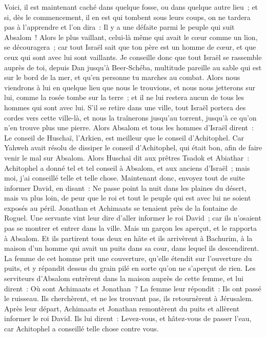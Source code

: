 \begin{multicols}{2}
Voici, il est maintenant caché dans quelque fosse, ou dans quelque autre lieu~; et si, dès le commencement, il en est qui tombent sous leurs coups, on ne tardera pas à l'apprendre et l'on dira~: Il y a une défaite parmi le peuple qui suit Absalom~!
Alors le plus vaillant, celui-là même qui avait le cœur comme un lion, se découragera~; car tout Israël sait que ton père est un homme de cœur, et que ceux qui sont avec lui sont vaillants.
Je conseille donc que tout Israël se rassemble auprès de toi, depuis Dan jusqu'à Beer-Schéba, multitude pareille au sable qui est sur le bord de la mer, et qu'en personne tu marches au combat.
Alors nous viendrons à lui en quelque lieu que nous le trouvions, et nous nous jetterons sur lui, comme la rosée tombe sur la terre~; et il ne lui restera aucun de tous les hommes qui sont avec lui.
S'il se retire dans une ville, tout Israël portera des cordes vers cette ville-là, et nous la traînerons jusqu'au torrent, jusqu'à ce qu'on n'en trouve plus une pierre.
Alors Absalom et tous les hommes d'Israël dirent~: Le conseil de Huschaï, l'Arkien, est meilleur que le conseil d'Achitophel. Car Yahweh avait résolu de dissiper le conseil d'Achitophel, qui était bon, afin de faire venir le mal sur Absalom.
Alors Huschaï dit aux prêtres Tsadok et Abiathar~: Achitophel a donné tel et tel conseil à Absalom, et aux anciens d'Israël~; mais moi, j'ai conseillé telle et telle chose.
Maintenant donc, envoyez tout de suite informer David, en disant~: Ne passe point la nuit dans les plaines du désert, mais va plus loin, de peur que le roi et tout le peuple qui est avec lui ne soient exposés au péril.
Jonathan et Achimaats se tenaient près de la fontaine de Roguel. Une servante vint leur dire d'aller informer le roi David~; car ils n'osaient pas se montrer et entrer dans la ville.
Mais un garçon les aperçut, et le rapporta à Absalom. Et ils partirent tous deux en hâte et ils arrivèrent à Bachurim, à la maison d'un homme qui avait un puits dans sa cour, dans lequel ils descendirent.
La femme de cet homme prit une couverture, qu'elle étendit sur l'ouverture du puits, et y répandit dessus du grain pilé en sorte qu'on ne s'aperçut de rien.
Les serviteurs d'Absalom entrèrent dans la maison auprès de cette femme, et lui dirent~: Où sont Achimaats et Jonathan~? La femme leur répondit~: Ils ont passé le ruisseau. Ils cherchèrent, et ne les trouvant pas, ils retournèrent à Jérusalem.
Après leur départ, Achimaats et Jonathan remontèrent du puits et allèrent informer le roi David. Ils lui dirent~: Levez-vous, et hâtez-vous de passer l'eau, car Achitophel a conseillé telle chose contre vous.

\end{multicols}
